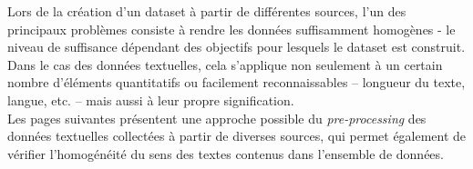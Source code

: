 Lors de la création d'un dataset à partir de différentes sources, l'un des principaux problèmes consiste à rendre les données suffisamment homogènes - le niveau de suffisance dépendant des objectifs pour lesquels le dataset est construit. Dans le cas des données textuelles, cela s'applique non seulement à un certain nombre d'éléments quantitatifs ou facilement reconnaissables – longueur du texte, langue, etc. – mais aussi à leur propre signification.\\

 Les pages suivantes présentent une approche possible du \emph{pre-processing} des données textuelles collectées à partir de diverses sources, qui permet également de vérifier l'homogénéité du sens des textes contenus dans l'ensemble de données.